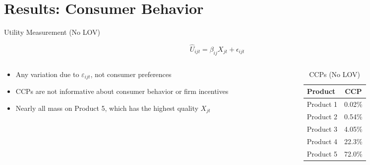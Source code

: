 \documentclass[aspectratio=169,professionalfonts]{beamer}
\begin{document}
\section{Results: Consumer Behavior}

\begin{frame}{Utility Measurement (No LOV)}
  \begin{tcolorbox}[colback=red!5!white, colframe=UGARed, title=\textbf{Utility Function without LOV}]
    \begin{equation*}
      \hat{U}_{ijt} = \beta_{ij} X_{jt} + \epsilon_{ijt}
    \end{equation*}
  \end{tcolorbox}
  \begin{columns}[T]
    \begin{column}{0.5\textwidth}
      
      \begin{itemize}
        \item Any variation due to $\varepsilon_{ijt}$, not consumer preferences
        \item CCPs are not informative about consumer behavior or firm incentives
        \item Nearly all mass on Product 5, which has the highest quality $X_{jt}$
      \end{itemize}
    \end{column}
    \begin{column}{0.47\textwidth}
      \begin{table}
        \caption{CCPs (No LOV)}
        \begin{tabular}{lc}
          \toprule
          Product & CCP \\
          \midrule
          Product 1     & 0.02\% \\
          Product 2     & 0.54\% \\
          Product 3     & 4.05\% \\
          Product 4     & 22.3\% \\
          Product 5     & 72.0\% \\
          \bottomrule
        \end{tabular}
      \end{table}
    \end{column}
  \end{columns}
\end{frame}
\end{document}
